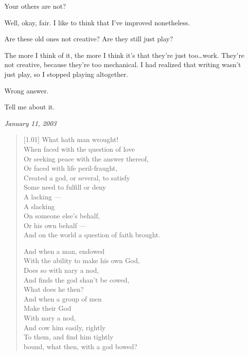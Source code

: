 \begin{paracol}{2}
\begin{leftcolumn}
\begin{ally}
Your others are not?
\end{ally}
Well, okay, fair. I like to think that I've improved nonetheless.

\begin{ally}
Are these old ones not creative? Are they still just play?
\end{ally}
The more I think of it, the more I think it's that they're just too\ldots{}work. They're not creative, because they're too mechanical. I had realized that writing wasn't just play, so I stopped playing altogether.

\begin{ally}
Wrong answer.
\end{ally}
Tell me about it.
\newpage
\end{leftcolumn}
\begin{rightcolumn*}
  \begin{flushright}
\emph{January 11, 2003}
\end{flushright}
\end{rightcolumn*}
\begin{leftcolumn}
\begin{verse}[1.01\textwidth]
What hath man wrought!\\
\vin When faced with the question of love\\
\vin Or seeking peace with the answer thereof,\\
Or faced with life peril-fraught,\\
\vin Created a god, or several, to satisfy\\
\vin Some need to fulfill or deny\\
\vin \vin A lacking ---\\
\vin \vin A slacking\\
\vin On someone else's behalf,\\
\vin Or his own behalf ---\\
And on the world a question of faith brought.

And when a man, endowed\\
\vin With the ability to make his own God,\\
\vin Does so with nary a nod,\\
And finds the god shan't be cowed,\\
\vin What does he then?\\
\vin And when a group of men\\
\vin \vin Make their God\\
\vin \vin With nary a nod,\\
\vin And cow him easily, rightly\\
\vin To them, and find him tightly\\
bound, what then, with a god bowed?\newpage


\end{verse}
\end{leftcolumn}
\end{paracol}
